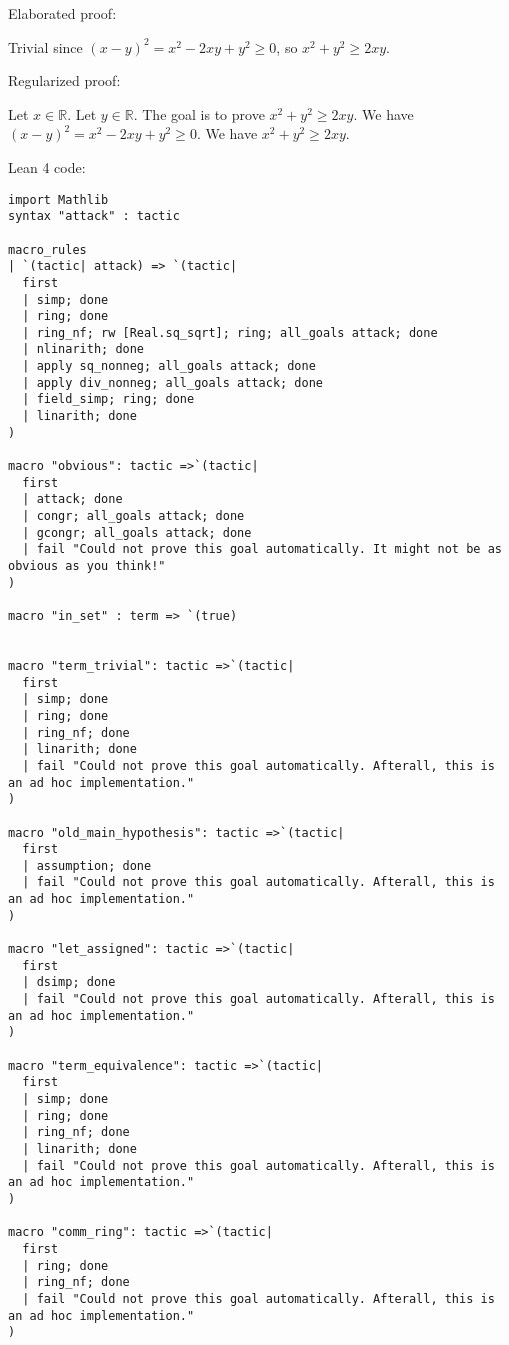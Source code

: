 \documentclass{article}
\begin{document}
Elaborated proof:
\begin{tcolorbox}[colback=green!10, width=\linewidth]
Trivial since $(x-y)^2 = x^2 -2xy + y^2 \ge 0$, so $x^2 + y^2 \ge 2xy$.
\end{tcolorbox}

Regularized proof:
\begin{tcolorbox}[colback=red!10, width=\linewidth]
Let $x\in\mathbb{R}$.
Let $y\in\mathbb{R}$.
The goal is to prove $x^2 + y^2 \ge 2xy$.
We have ${{(x-y)}}^2 = x^2 -2xy + y^2 \ge 0$.
We have $x^2 + y^2 \ge 2xy$.
\end{tcolorbox}

Lean 4 code:
\begin{tcolorbox}[colback=white!10, width=\linewidth]
\begin{lstlisting}[language=Lean4]
import Mathlib
syntax "attack" : tactic

macro_rules
| `(tactic| attack) => `(tactic|
  first
  | simp; done
  | ring; done
  | ring_nf; rw [Real.sq_sqrt]; ring; all_goals attack; done
  | nlinarith; done
  | apply sq_nonneg; all_goals attack; done
  | apply div_nonneg; all_goals attack; done
  | field_simp; ring; done
  | linarith; done
)

macro "obvious": tactic =>`(tactic|
  first
  | attack; done
  | congr; all_goals attack; done
  | gcongr; all_goals attack; done
  | fail "Could not prove this goal automatically. It might not be as obvious as you think!"
)

macro "in_set" : term => `(true)


macro "term_trivial": tactic =>`(tactic|
  first
  | simp; done
  | ring; done
  | ring_nf; done
  | linarith; done
  | fail "Could not prove this goal automatically. Afterall, this is an ad hoc implementation."
)

macro "old_main_hypothesis": tactic =>`(tactic|
  first
  | assumption; done
  | fail "Could not prove this goal automatically. Afterall, this is an ad hoc implementation."
)

macro "let_assigned": tactic =>`(tactic|
  first
  | dsimp; done
  | fail "Could not prove this goal automatically. Afterall, this is an ad hoc implementation."
)

macro "term_equivalence": tactic =>`(tactic|
  first
  | simp; done
  | ring; done
  | ring_nf; done
  | linarith; done
  | fail "Could not prove this goal automatically. Afterall, this is an ad hoc implementation."
)

macro "comm_ring": tactic =>`(tactic|
  first
  | ring; done
  | ring_nf; done
  | fail "Could not prove this goal automatically. Afterall, this is an ad hoc implementation."
)


\end{lstlisting}
\end{tcolorbox}
\end{document}
